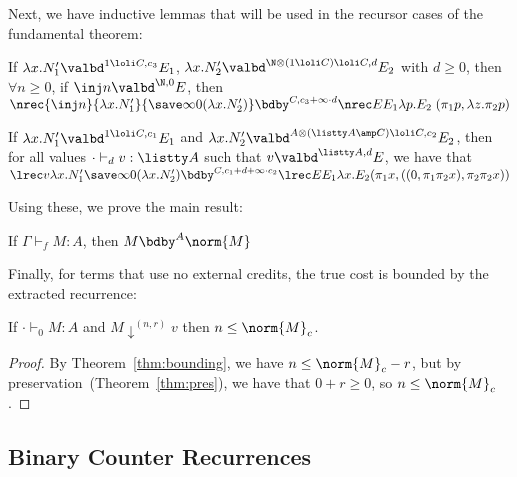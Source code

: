 Next, we have inductive lemmas that will be used in the recursor cases
of the fundamental theorem:

\begin{theorem}[$\N$-Recursor]
\label{thm:nrec-lemma}
If $\lambda x.N_1' \valbd^{1 \loli C,c_3} E_1$, $\lambda x.N_2' \valbd^{\N
\otimes (1 \loli C) \loli C,d} E_2$ with $d \geq 0$, then $\forall n \geq 0$, if $\inj n \valbd^{\N,0} E$, then $\nrec {\inj n} {\lambda x.N_1'} {\save \infty 0 (\lambda x.N_2')} \bdby^{C,c_3 + \infty \cdot d} \nrec E {E_1} {\lambda p. E_2 \; (\pi_1 p, \lambda z.\pi_2 p)}$
\end{theorem}

\begin{theorem}
\label{thm:lrec-lemma}
If $\lambda x.N_1' \valbd^{1 \loli C,c_1} E_1$ and $\lambda x.N_2'
\valbd^{A \otimes (\listty A \amp C) \loli C,c_2} E_2$, then for all
values $\cdot \vdash_d v : \listty A$ such that $v \valbd^{\listty A,d}
E$, we have that\\
$\lrec v {\lambda x.N_1'} {\save \infty 0 {(\lambda x.N_2')}} \bdby^{C,c_1+d + \infty \cdot c_2} \lrec E {E_1} {\lambda x. E_2 (\pi_1 x,((0,\pi_1 \pi_2 x),\pi_2\pi_2 x)) }$
\end{theorem}

Using these, we prove the main result:

\begin{theorem}
\label{thm:bounding}
If $\Gamma \vdash_f M : A$, then $M \bdby^A \norm{M}$
\end{theorem}

Finally, for terms that use no external credits, the true cost is
bounded by the extracted recurrence: 

\begin{corollary} \label{cor:true-cost}
If $\cdot \vdash_0 M : A$ and $M \downarrow^{(n,r)} v$ then $n \le
\norm{M}_c$.
\end{corollary}
\begin{proof}
By Theorem~\ref{thm:bounding}, we have $n \le \norm{M}_c - r$, but by
preservation~(Theorem~\ref{thm:pres}), we have that $0 + r \ge 0$, so
$n \le \norm{M}_c$.  
\end{proof}

\subsection{Binary Counter Recurrences}

